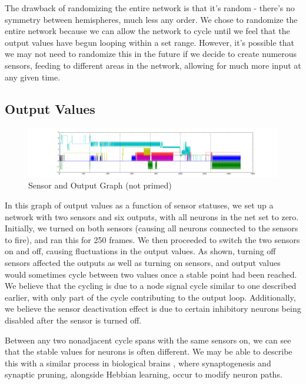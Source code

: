 \documentclass[12pt]{article}
\begin{document}
The drawback of randomizing the entire network is that it's random - there's no symmetry between hemispheres, much less any order.  We chose to randomize the entire network because we can allow the network to cycle until we feel that the output values have begun looping within a set range.  However, it's possible that we may not need to randomize this in the future if we decide to create numerous sensors, feeding to different areas in the network, allowing for much more input at any given time.

\subsection{Output Values} \label{outputvals}

\begin{figure}[H]
    \includegraphics[width=\linewidth]{../visualizations/8knodes_unrandomized.png}
    \caption{Sensor and Output Graph (not primed)}
    \label{fig:unprimed_sensoroutput_graph}
\end{figure}

In this graph of output values as a function of sensor statuses, we set up a network with two sensors and six outputs, with all neurons in the net set to zero.  Initially, we turned on both sensors (causing all neurons connected to the sensors to fire), and ran this for 250 frames.  We then proceeded to switch the two sensors on and off, causing fluctuations in the output values.  As shown, turning off sensors affected the outputs as well as turning on sensors, and output values would sometimes cycle between two values once a stable point had been reached.  We believe that the cycling is due to a node signal cycle similar to one described earlier, with only part of the cycle contributing to the output loop.  Additionally, we believe the sensor deactivation effect is due to certain inhibitory neurons being disabled after the sensor is turned off.

Between any two nonadjacent cycle spans with the same sensors on, we can see that the stable values for neurons is often different.  We may be able to describe this with a similar process in biological brains \cite{synapticlearning,synapticpruning}, where synaptogenesis and synaptic pruning, alongside Hebbian learning, occur to modify neuron paths. 
\end{document}

